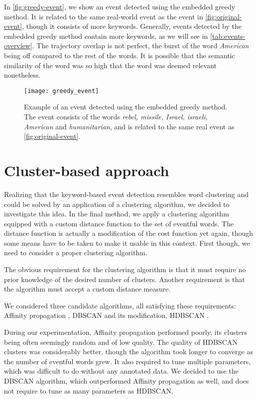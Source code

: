 In \autoref{fig:greedy-event}, we show an event detected using the embedded greedy method. It is related to the same real-world event as the event in \autoref{fig:original-event}, though it consists of more keywords. Generally, events detected by the embedded greedy method contain more keywords, as we will see in \autoref{tab:events-overview}. The trajectory overlap is not perfect, the burst of the word \textit{American} being off compared to the rest of the words. It is possible that the semantic similarity of the word was so high that the word was deemed relevant nonetheless.

\begin{figure}
  \centering
  \texttt{[image: greedy\_event]}  %
  \caption{Example of an event detected using the embedded greedy method. The event consists of the words \textit{rebel, missile, Israel, israeli, American} and \textit{humanitarian}, and is related to the same real event as \autoref{fig:original-event}.}
  \label{fig:greedy-event}
\end{figure}


\section{Cluster-based approach}
Realizing that the keyword-based event detection resembles word clustering and could be solved by an application of a clustering algorithm, we decided to investigate this idea. In the final method, we apply a clustering algorithm equipped with a custom distance function to the set of eventful words. The distance function is actually a modification of the cost function yet again, though some means have to be taken to make it usable in this context. First though, we need to consider a proper clustering algorithm.

The obvious requirement for the clustering algorithm is that it must require no prior knowledge of the desired number of clusters. Another requirement is that the algorithm must accept a custom distance measure.

We considered three candidate algorithms, all satisfying these requirements: Affinity propagation \citep{affinity-propagation}, DBSCAN \citep{dbscan} and its modification, HDBSCAN \citep{hdbscan}.

During our experimentation, Affinity propagation performed poorly, its clusters being often seemingly random and of low quality. The quality of HDBSCAN clusters was considerably better, though the algorithm took longer to converge as the number of eventful words grew. It also required to tune multiple parameters, which was difficult to do without any annotated data. We decided to use the DBSCAN algorithm, which outperformed Affinity propagation as well, and does not require to tune as many parameters as HDBSCAN.

